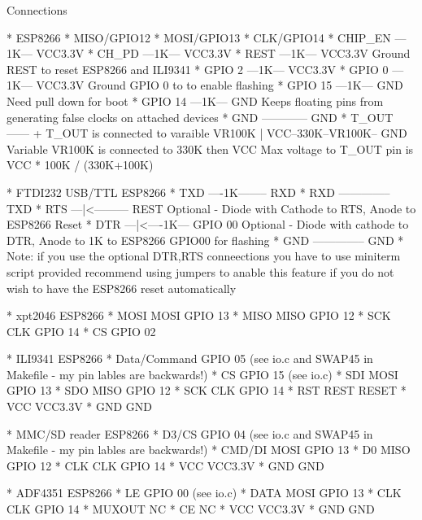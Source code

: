 \begin{DoxyParagraph}{Connections}
\begin{DoxyVerb}* ESP8266           
  * MISO/GPIO12 
  * MOSI/GPIO13
  * CLK/GPIO14
  * CHIP_EN ---1K--- VCC3.3V
  * CH_PD   ---1K--- VCC3.3V
  * REST    ---1K--- VCC3.3V   Ground REST to reset ESP8266 and ILI9341
  * GPIO  2 ---1K--- VCC3.3V
  * GPIO  0 ---1K--- VCC3.3V   Ground GPIO 0 to to enable flashing
  * GPIO 15 ---1K--- GND       Need pull down for boot
  * GPIO 14 ---1K--- GND       Keeps floating pins from generating false clocks on attached devices
  * GND ------------ GND
  * T_OUT ------ +            T_OUT is connected to varaible VR100K 
                 | 
    VCC--330K--VR100K-- GND   Variable VR100K is connected to 330K then VCC
                              Max voltage to T_OUT pin is VCC * 100K / (330K+100K)

* FTDI232 USB/TTL      ESP8266 
  * TXD ----1K--------  RXD
  * RXD --------------  TXD
  * RTS ---|<--------- REST    Optional - Diode with Cathode to RTS, Anode to ESP8266 Reset
  * DTR ---|<----1K--- GPIO 00 Optional - Diode with cathode to DTR, Anode to 1K to ESP8266 GPIO00 for flashing
  * GND --------------  GND
  * Note: if you use the optional DTR,RTS conneections you have to use miniterm script provided
    recommend using jumpers to anable this feature if you do not wish to have the ESP8266 reset automatically

* xpt2046        ESP8266
  * MOSI   MOSI  GPIO 13
  * MISO   MISO  GPIO 12
  * SCK    CLK   GPIO 14 
  * CS           GPIO 02

* ILI9341        ESP8266
  * Data/Command GPIO 05 (see io.c and SWAP45 in Makefile - my pin lables are backwards!)
  * CS           GPIO 15 (see io.c)
  * SDI    MOSI  GPIO 13
  * SDO    MISO  GPIO 12
  * SCK    CLK   GPIO 14 
  * RST    REST  RESET
  * VCC          VCC3.3V
  * GND          GND

* MMC/SD reader  ESP8266
  * D3/CS        GPIO 04 (see io.c and SWAP45 in Makefile - my pin lables are backwards!)
  * CMD/DI MOSI  GPIO 13
  * D0     MISO  GPIO 12
  * CLK    CLK   GPIO 14
  * VCC          VCC3.3V
  * GND          GND

* ADF4351        ESP8266
  * LE           GPIO 00 (see io.c)
  * DATA   MOSI  GPIO 13
  * CLK     CLK  GPIO 14
  * MUXOUT            NC
  * CE                NC
  * VCC          VCC3.3V
  * GND          GND
\end{DoxyVerb}

\end{DoxyParagraph}
